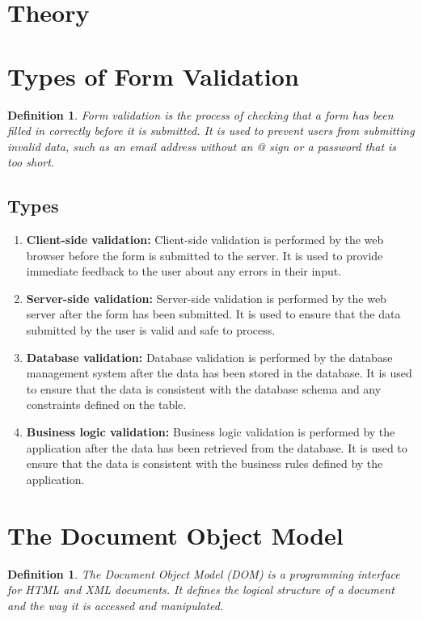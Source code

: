 \documentclass[11pt]{article}
\newtheorem{dfn}[thm]{Definition}
\begin{document}
\section{Theory}

\section{Types of Form Validation}

\begin{dfn}
    Form validation is the process of checking that a form has been filled in correctly before it is submitted. It is used to prevent users from submitting invalid data, such as an email address without an @ sign or a password that is too short.
\end{dfn}


\subsection{Types}
\begin{enumerate}
    \item \textbf{Client-side validation:} Client-side validation is performed by the web browser before the form is submitted to the server. It is used to provide immediate feedback to the user about any errors in their input.
    \item \textbf{Server-side validation:} Server-side validation is performed by the web server after the form has been submitted. It is used to ensure that the data submitted by the user is valid and safe to process.
    \item \textbf{Database validation:} Database validation is performed by the database management system after the data has been stored in the database. It is used to ensure that the data is consistent with the database schema and any constraints defined on the table.
    \item \textbf{Business logic validation:} Business logic validation is performed by the application after the data has been retrieved from the database. It is used to ensure that the data is consistent with the business rules defined by the application.
\end{enumerate}


\section{The Document Object Model}

\begin{dfn}
    The Document Object Model (DOM) is a programming interface for HTML and XML documents. It defines the logical structure of a document and the way it is accessed and manipulated.
\end{dfn}
\end{document}
